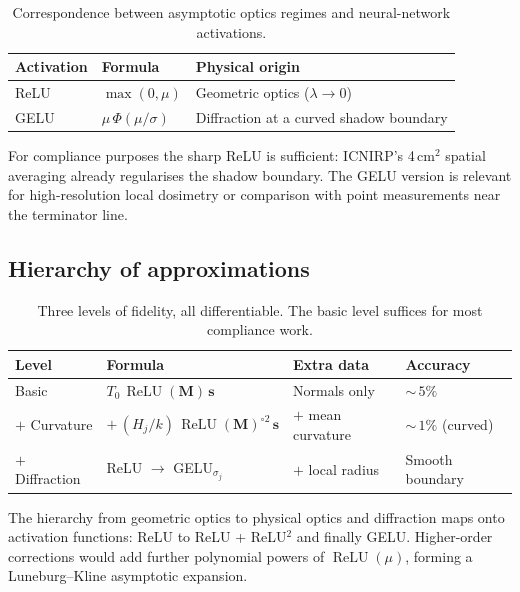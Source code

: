 \documentclass[11pt,a4paper]{article}
\theoremstyle{definition}      %
\DeclareMathOperator{\ReLU}{ReLU}
\begin{document}
\begin{table}[!htbp]
\centering
\caption{Correspondence between asymptotic optics regimes and
  neural-network activations.}\label{tab:activations}
\begin{tabular}{lll}
\toprule
Activation & Formula & Physical origin \\
\midrule
ReLU  & $\max(0,\mu)$ & Geometric optics ($\lambda\to 0$) \\
GELU  & $\mu\,\Phi(\mu/\sigma)$ &
  Diffraction at a curved shadow boundary \\
\bottomrule
\end{tabular}
\end{table}

For compliance purposes the sharp ReLU is sufficient: ICNIRP's
4\,cm$^2$ spatial averaging already regularises the shadow boundary.
The GELU version is relevant for high-resolution local dosimetry or
comparison with point measurements near the terminator line.

\subsection{Hierarchy of approximations}\label{sec:hierarchy-approx}

\begin{table}[!htbp]
\centering
\caption{Three levels of fidelity, all differentiable.  The basic
  level suffices for most compliance work.}\label{tab:fidelity}
\begin{tabular}{llll}
\toprule
Level & Formula & Extra data & Accuracy \\
\midrule
Basic       & $T_0\,\ReLU(\mathbf{M})\,\mathbf{s}$
  & Normals only & ${\sim}\,5\%$ \\
$+$ Curvature & $+\,(H_j/k)\,\ReLU(\mathbf{M})^{\circ 2}\,\mathbf{s}$
  & $+$ mean curvature & ${\sim}\,1\%$ (curved) \\
$+$ Diffraction & ReLU $\to$ GELU$_{\sigma_j}$
  & $+$ local radius & Smooth boundary \\
\bottomrule
\end{tabular}
\end{table}

The hierarchy from geometric optics to physical optics and diffraction
maps onto activation functions: ReLU to ReLU + ReLU$^2$ and finally GELU.
Higher-order corrections would add further polynomial powers of $\ReLU(\mu)$,
forming a Luneburg--Kline asymptotic expansion.


\end{document}
